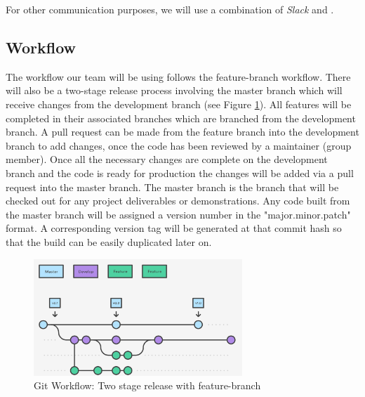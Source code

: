 \documentclass[11pt]{article}
\begin{document}
For other communication purposes, we will use a combination of \textit{Slack} and .

\subsection{Workflow}
The workflow our team will be using follows the feature-branch workflow. There will also be a two-stage release process involving the master branch which will receive changes from the development branch (see Figure \ref{fig:gitworkflow}). All features will be completed in their associated branches which are branched from the development branch. A pull request can be made from the feature branch into the development branch to add changes, once the code has been reviewed by a maintainer (group member). Once all the necessary changes are complete on the development branch and the code is ready for production the changes will be added via a pull request into the master branch. The master branch is the branch that will be checked out for any project deliverables or demonstrations. Any code built from the master branch will be assigned a version number in the "major.minor.patch" format. A corresponding version tag will be generated at that commit hash so that the build can be easily duplicated later on.


\begin{figure}
  \centering
  \includegraphics[width=0.7\textwidth]{img/gitbranches.PNG} %
  \caption{Git Workflow: Two stage release with feature-branch}
  \label{fig:gitworkflow}
\end{figure}
\end{document}

